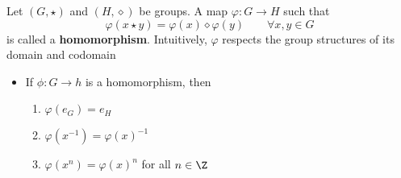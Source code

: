 \documentclass[11pt]{article}
\begin{document}
\begin{definition*}
     Let $(G,\star)$ and $(H,\diamond)$ be groups. A map $\varphi:G\to H$ such that 
    \[
        \varphi(x\star y) = \varphi(x) \diamond \varphi(y)
        \quad \quad
        \forall x,y\in G    
    \]
    is called a \textbf{homomorphism}. Intuitively, $\varphi$ respects the group structures of its domain and codomain
    \begin{itemize}
        \item {} If $\phi: G\to h$ is a homomorphism, then 
        \begin{enumerate}
            \item $\varphi(e_G) = e_H$
            \item $\varphi(x^{-1}) = \varphi(x)^{-1}$
            \item $\varphi(x^n) = \varphi(x)^n$ for all $n\in\Z$
        \end{enumerate}
    \end{itemize}
\end{definition*}
\end{document}
